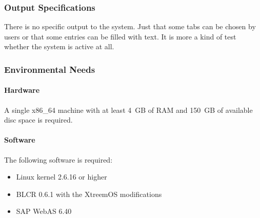 \subsubsection{Output Specifications}
There is no specific output to the system. Just that some tabs can be chosen by users or that some entries can be filled with text. It is more a kind of test whether the system is active at all.

\subsubsection{Environmental Needs}

\paragraph{Hardware}
A single x86\_64 machine with at least 4~GB of RAM and 150~GB of available disc space is required.

\paragraph{Software}
The following software is required:
\begin{itemize}
\item Linux kernel 2.6.16 or higher
\item BLCR 0.6.1 with the XtreemOS modifications
\item SAP WebAS 6.40
\end{itemize}
